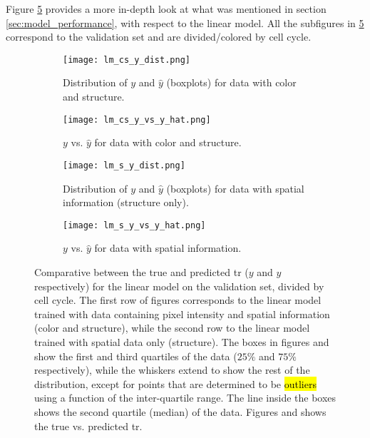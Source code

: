 
\glsresetall
\graphicspath{{./Sections/Results/Resources/}}


Figure \ref{fig:results:lm_performance} provides a more in-depth look at what was mentioned in section \ref{sec:model_performance}, with respect to the linear model. All the subfigures in \ref{fig:results:lm_performance} correspond to the validation set and are divided/colored by cell cycle.

\begin{figure}[!ht]
  \centering
  \begin{subfigure}[b]{.5\linewidth}
    \texttt{[image: lm\_cs\_y\_dist.png]}
    \caption{Distribution of $y$ and $\hat{y}$ (boxplots) for data with color and structure.}
    \label{fig:results:lm_performance:cs_dist}
  \end{subfigure}
  \begin{subfigure}[b]{.27\linewidth}
    \texttt{[image: lm\_cs\_y\_vs\_y\_hat.png]}
    \caption{$y$ vs. $\hat{y}$ for data with color and structure.}
    \label{fig:results:lm_performance:cs_y_vs_y_hat}
  \end{subfigure}%
  \vspace{3mm}
  \begin{subfigure}[b]{.5\linewidth}
    \texttt{[image: lm\_s\_y\_dist.png]}
    \caption{Distribution of $y$ and $\hat{y}$ (boxplots) for data with spatial information (structure only).}
    \label{fig:results:lm_performance:s_dist}
  \end{subfigure}
  \begin{subfigure}[b]{.27\linewidth}
    \texttt{[image: lm\_s\_y\_vs\_y\_hat.png]}
    \caption{$y$ vs. $\hat{y}$ for data with spatial information.}
    \label{fig:results:lm_performance:s_y_vs_y_hat}
  \end{subfigure}
  \caption{Comparative between the true and predicted \gls{tr} ($y$ and $\hat{y}$ respectively) for the linear model on the validation set, divided by cell cycle. The first row of figures corresponds to the linear model trained with data containing pixel intensity and spatial information (color and structure), while the second row to the linear model trained with spatial data only (structure). The boxes in figures  and  show the first and third quartiles of the data ($25\%$ and $75\%$ respectively), while the whiskers extend to show the rest of the distribution, except for points that are determined to be \hl{outliers} using a function of the inter-quartile range. The line inside the boxes shows the second quartile (median) of the data. Figures  and  shows the true vs. predicted \gls{tr}.}
  \label{fig:results:lm_performance}
\end{figure}

